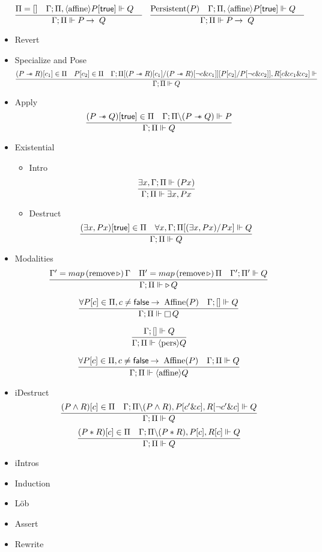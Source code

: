 \begin{itemize}
  \begin{equation*}
  \infer{\entailsD P \imp Q}
        {\SpatD = [] &
          \entails {\IntuD} {\SpatD , \affine P[\true]} {Q} &
        }
   \quad
  \infer{\entailsD P \imp Q}
        {\Persistent P &
         \entails {\IntuD} {\SpatD , \affine P[\true]} {Q} &
        }
  \end{equation*}
\item Revert
\item Specialize and Pose
  \[
  \infer{\entailsD Q}
        {(P \wand R)[c_1] \in \SpatD &
         P[c_2] \in \SpatD &
         \entails{\IntuD}{\SpatD [(P \wand R)[c_1] /
                                  (P \wand R)[\neg c \& c_1]]
                                 [P[c_2] / P [\neg c \& c_2]],
                                 R[c \& c_1 \& c_2]}}
  \]
\item Apply
  \[
  \infer{\entailsD Q}
        {(P \wand Q)[\true] \in \SpatD &
         \entails \IntuD {\SpatD \backslash (P \wand Q)} {P}}
  \]
\item Existential
  \begin{itemize}
  \item Intro
    \[
    \infer{\entailsD \exists x, P x}
          {\exists x, \entailsD (P x)}
    \]
  \item Destruct
    \[
    \infer{\entailsD Q}
          {(\exists x, P x)[\true] \in \SpatD &
           \forall x, \entails \IntuD {\SpatD [(\exists x, P x) / P x]} Q}
    \]
  \end{itemize}
\item Modalities
  \[
  \infer{\entailsD {\later Q}}
        {\IntuD' = \mathop{map} {(\text{remove} \later)}\, {\IntuD}  &
         {\SpatD}' = \mathop{map} {(\text{remove} \later)}\, {\SpatD}  &
         \entails {\IntuD'} {\SpatD'} {Q}}
  \]

  \[
  \infer{\entailsD {\intuit Q}}
        {\forall P[c] \in \SpatD, c \neq \false \imp \Affine P &
         \entails \IntuD {[]} Q}
  \]

  \[
  \infer{\entailsD {\pers Q}}
        {\entails \IntuD {[]} Q}
  \]

  \[
  \infer{\entailsD {\affine Q}}
        {\forall P[c] \in \SpatD, c \neq \false \imp \Affine P &
         \entailsD Q}
  \]
\item iDestruct
  \[
  \infer{\entailsD Q}
        {(P \wedge R)[c] \in \SpatD &
         \entails {\IntuD}
                  {\SpatD \backslash (P \wedge R), P[c' \& c], R [\neg c' \& c]}
                  {Q}}
  \]
  \[
  \infer{\entailsD Q}
        {(P \ast R)[c] \in \SpatD &
         \entails {\IntuD} {\SpatD \backslash (P \ast R), P[c], R [c]} Q}
  \]
\item iIntros
\item Induction
\item Löb
\item Assert
\item Rewrite
\end{itemize}

